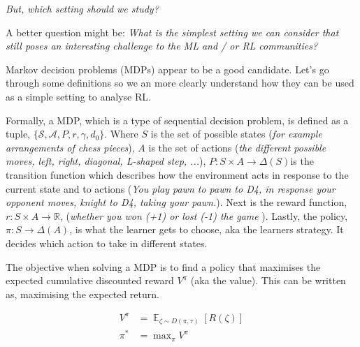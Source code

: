 \begin{displayquote}
  \textsl{But, which setting should we study?\footnotemark[26]}
\end{displayquote}


\begin{displayquote}
  A better question might be: \textsl{What is the simplest setting we can
  consider that still poses an interesting challenge to the ML and / or RL communities?}
\end{displayquote}

Markov decision problems (MDPs) appear to be a good candidate. Let's go through some definitions so we an more clearly understand how they can be used as a
simple setting to analyse RL.

Formally, a MDP, which is a type of sequential decision problem, is defined
as a tuple, $\{\mathcal S, \mathcal A, P,r, \gamma, d_0\}$.
Where $S$ is the set of possible states (\textit{for example arrangements of chess pieces}),
$A$ is the set of actions (\textit{the different possible moves, left,
right, diagonal, L-shaped step, ...}),  $P: S \times A \to \Delta(S)$\footnotemark[16]
is the transition function which describes how the environment acts in response
to the current state and to actions (\textit{You play pawn to pawn to D4, in response your
opponent moves, knight to D4, taking your pawn.}). Next is the reward function, $r: S\times A \to \mathbb R$,
(\textit{whether you won (+1) or lost (-1) the game }).
Lastly, the policy, $\pi: S \to \Delta(A)$, is what the learner gets to choose, aka the learners strategy.
It decides which action to take in different states.


\vspace{5mm}

The objective when solving a MDP is to find a policy
that maximises the expected cumulative discounted reward $V^{\pi}$ (aka the value). This
can be written as, maximising the expected return.

\begin{align*}
V^{\pi} &= \mathop{\mathbb E}_{\zeta \sim D(\pi, \tau)} [R(\zeta)] \tag{state value}\label{state-value}\\
\pi^{* } &= \mathop{\text{max}}_{\pi}V^{\pi}
\end{align*}


